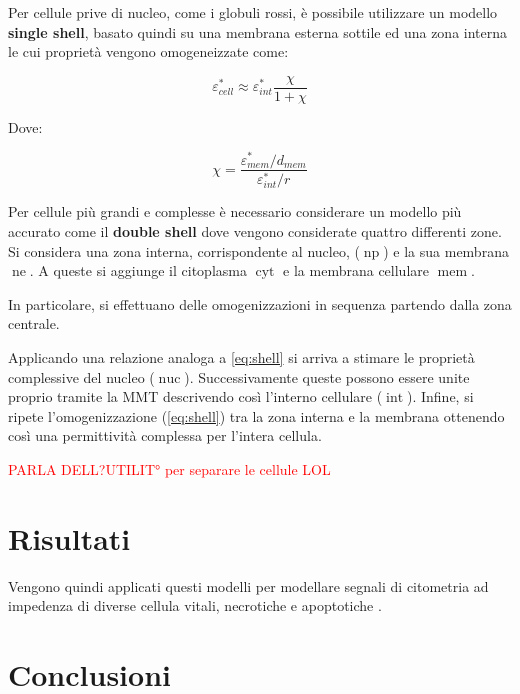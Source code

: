 Per cellule prive di nucleo, come i globuli rossi, è possibile utilizzare un modello \textbf{single shell}, basato quindi su una membrana esterna sottile ed una zona interna le cui proprietà vengono omogeneizzate come:

\begin{equation}
	\varepsilon_{c e l l}^{*} \approx \varepsilon_{i n t}^{*} \frac{\chi}{1+\chi}
	\label{eq:shell}
\end{equation}

Dove:

\begin{equation}
	\chi=\frac{\varepsilon_{m e m}^{*} / d_{m e m}}{\varepsilon_{i n t}^{*} / r}
\end{equation}

Per cellule più grandi e complesse è necessario considerare un modello più accurato come il \textbf{double shell} dove vengono considerate quattro differenti zone. Si considera una zona interna, corrispondente al nucleo, ($\operatorname{np}$) e la sua membrana $\operatorname{ne}$. A queste si aggiunge il citoplasma $\operatorname{cyt}$ e la membrana cellulare $\operatorname{mem}$. 

In particolare, si effettuano delle omogenizzazioni in sequenza partendo dalla zona centrale. 

Applicando una relazione analoga a \cref{eq:shell} si arriva a stimare le proprietà complessive del nucleo ($\operatorname{nuc}$). Successivamente queste possono essere unite proprio tramite la MMT descrivendo così l'interno cellulare ($\operatorname{int}$). Infine, si ripete l'omogenizzazione (\cref{eq:shell}) tra la zona interna e la membrana ottenendo così una permittività complessa per l'intera cellula. 

\textcolor{red}{PARLA DELL?UTILIT° per separare le cellule LOL}

\section{Risultati}

Vengono quindi applicati questi modelli per modellare segnali di citometria ad impedenza di diverse cellula vitali, necrotiche e apoptotiche \cite{de_ninno_high-throughput_2020}.




\textcolor{blue}{\lipsum[1-4]}





\section{Conclusioni}

